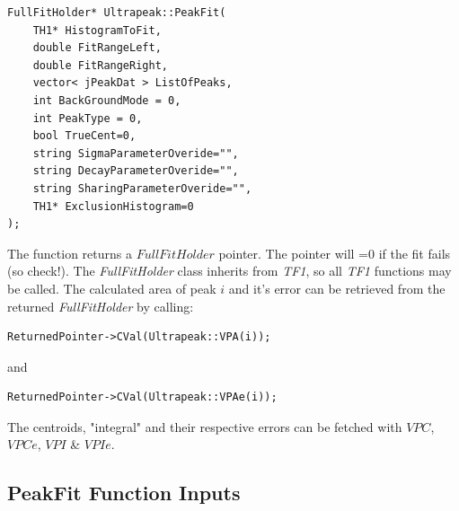 \documentclass[a4paper,10pt]{article}
\begin{document}
\lstset{language=C++}
\begin{lstlisting}
FullFitHolder* Ultrapeak::PeakFit(
	TH1* HistogramToFit,
	double FitRangeLeft,
	double FitRangeRight,
	vector< jPeakDat > ListOfPeaks,
	int BackGroundMode = 0,
	int PeakType = 0,
	bool TrueCent=0,
	string SigmaParameterOveride="",
	string DecayParameterOveride="",
	string SharingParameterOveride="",
	TH1* ExclusionHistogram=0
);
\end{lstlisting}

The function returns a $FullFitHolder$ pointer. The pointer will =0 if the fit fails (so check!).
The \textit{FullFitHolder} class inherits from \textit{TF1}, so all \textit{TF1} functions may be called.
The calculated area of peak $i$ and it's error can be retrieved from the returned \textit{FullFitHolder} by calling:
\lstset{language=C++}
\begin{lstlisting}
ReturnedPointer->CVal(Ultrapeak::VPA(i));
\end{lstlisting}
and
\lstset{language=C++}
\begin{lstlisting}
ReturnedPointer->CVal(Ultrapeak::VPAe(i));
\end{lstlisting}
The centroids, "integral" and their respective errors can be fetched with $VPC$, $VPCe$, $VPI$ \& $VPIe$.


\subsection{PeakFit Function Inputs}
\end{document}
